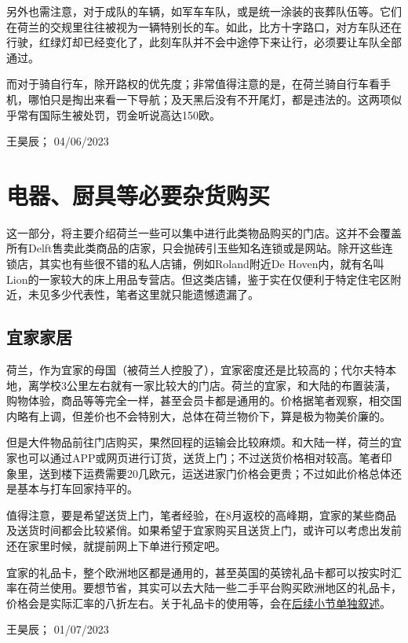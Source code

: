 另外也需注意，对于成队的车辆，如军车车队，或是统一涂装的丧葬队伍等。它们在荷兰的交规里往往被视为一辆特别长的车。如此，比方十字路口，对方车队还在行驶，红绿灯却已经变化了，此刻车队并不会中途停下来让行，必须要让车队全部通过。

而对于骑自行车，除开路权的优先度；非常值得注意的是，在荷兰骑自行车看手机，哪怕只是掏出来看一下导航；及天黑后没有不开尾灯，都是违法的。这两项似乎常有国际生被处罚，罚金听说高达150欧。
\begin{flushright}
王昊辰； 04/06/2023
\end{flushright}

\vspace{\betsubsec} %
\section{电器、厨具等必要杂货购买}
这一部分，将主要介绍荷兰一些可以集中进行此类物品购买的门店。这并不会覆盖所有Delft售卖此类商品的店家，只会抛砖引玉些知名连锁或是网站。除开这些连锁店，其实也有些很不错的私人店铺，例如Roland附近De Hoven内，就有名叫Lion的一家较大的床上用品专营店。但这类店铺，鉴于实在仅便利于特定住宅区附近，未见多少代表性，笔者这里就只能遗憾遗漏了。
\subsection{宜家家居}
荷兰，作为宜家的母国（被荷兰人控股了），宜家密度还是比较高的；代尔夫特本地，离学校3公里左右就有一家比较大的门店。荷兰的宜家，和大陆的布置装潢，购物体验，商品等等完全一样，甚至会员卡都是通用的。价格据笔者观察，相交国内略有上调，但差价也不会特别大，总体在荷兰物价下，算是极为物美价廉的。

但是大件物品前往门店购买，果然回程的运输会比较麻烦。和大陆一样，荷兰的宜家也可以通过APP或网页进行订货，送货上门；不过送货价格相对较高。笔者印象里，送到楼下运费需要20几欧元，运送进家门价格会更贵；不过如此价格总体还是基本与打车回家持平的。

值得注意，要是希望送货上门，笔者经验，在8月返校的高峰期，宜家的某些商品及送货时间都会比较紧俏。如果希望于宜家购买且送货上门，或许可以考虑出发前还在家里时候，就提前网上下单进行预定吧。

宜家的礼品卡，整个欧洲地区都是通用的，甚至英国的英镑礼品卡都可以按实时汇率在荷兰使用。要想节省，其实可以去大陆一些二手平台购买欧洲地区的礼品卡，价格会是实际汇率的八折左右。关于礼品卡的使用等，会在\hyperlink{礼品卡}{\uline{后续小节单独叙述}}。
\begin{flushright}
王昊辰； 01/07/2023
\end{flushright}

